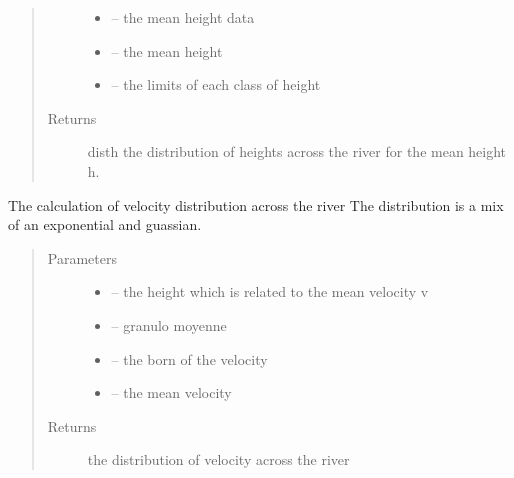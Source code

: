 \documentclass[letterpaper,10pt,english]{sphinxmanual}
\begin{document}
\begin{fulllineitems}
\begin{fulllineitems}
\begin{quote}
\begin{description}
\begin{itemize}
\item {} 
 -- the mean height data

\item {} 
 -- the mean height

\item {} 
 -- the limits of each class of height

\end{itemize}

\item[{Returns}] \leavevmode
disth the distribution of heights across the river for the mean height h.

\end{description}\end{quote}

\end{fulllineitems}


\begin{fulllineitems}
\label{\detokenize{index:src.stathab_c.Stathab.dist_v}}
The calculation of velocity distribution across the river
The distribution is a mix of an exponential and guassian.
\begin{quote}\begin{description}
\item[{Parameters}] \leavevmode\begin{itemize}
\item {} 
 -- the height which is related to the mean velocity v

\item {} 
 -- granulo moyenne

\item {} 
 -- the born of the velocity

\item {} 
 -- the mean velocity

\end{itemize}

\item[{Returns}] \leavevmode
the distribution of velocity across the river

\end{description}\end{quote}


\end{fulllineitems}
\end{fulllineitems}
\end{document}
